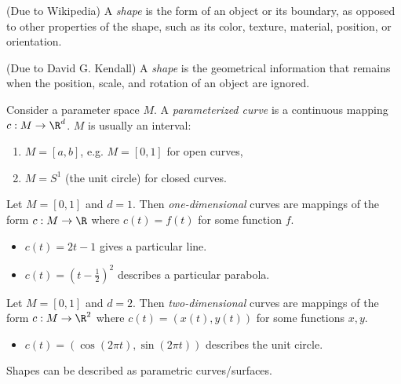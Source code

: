 \documentclass[12pt]{article}
\begin{document}
\begin{defn} (Due to Wikipedia)
    A \emph{shape} is the form of an object or its boundary, as opposed to other properties of the shape, such as its color, texture, material, position, or orientation.
\end{defn}

\begin{defn} (Due to David G. Kendall)
    A \emph{shape} is the geometrical information that remains when the position, scale, and rotation  of an object are ignored.
\end{defn}

\begin{defn}
    Consider a parameter space $M$. A \emph{parameterized curve} is a continuous mapping $c: M \to \R^d$. $M$ is usually an interval:
    \begin{enumerate}
        \item $M = [a, b]$, e.g. $M = [0, 1]$ for open curves,
        \item $M = S^1$ (the unit circle) for closed curves.
    \end{enumerate}
\end{defn}

\begin{exmp}
    Let $M = [0, 1]$ and $d = 1$. Then \emph{one-dimensional} curves are mappings of the form $c: M \to \R$ where $c(t) = f(t)$ for some function $f$.
    \begin{itemize}
        \item $c(t) = 2t - 1$ gives a particular line.
        \item $c(t) = (t - \frac{1}{2})^2$ describes a particular parabola.
    \end{itemize}
\end{exmp}

\begin{exmp}
    Let $M = [0, 1]$ and $d = 2$. Then \emph{two-dimensional} curves are mappings of the form $c: M \to \R^2$ where $c(t) = (x(t), y(t))$ for some functions $x, y$.
    \begin{itemize}
        \item $c(t) = (\cos(2\pi{t}), \sin(2\pi{t}))$ describes the unit circle.
    \end{itemize}
\end{exmp}

\begin{rmk}
    Shapes can be described as parametric curves/surfaces.
\end{rmk}
\end{document}

